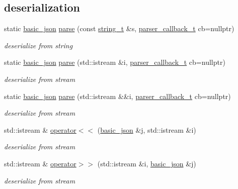 \subsection*{deserialization}
\begin{DoxyCompactItemize}
\item 
static \hyperlink{a00025}{basic\+\_\+json} \hyperlink{a00025_a35303ad045a06c2a79dc28ac29652e86}{parse} (const \hyperlink{a00025_ab63e618bbb0371042b1bec17f5891f42}{string\+\_\+t} \&s, \hyperlink{a00025_a9e35475e2027520a78e09f460dbe048a}{parser\+\_\+callback\+\_\+t} cb=nullptr)
\begin{DoxyCompactList}\small\item\em deserialize from string \end{DoxyCompactList}\item 
static \hyperlink{a00025}{basic\+\_\+json} \hyperlink{a00025_a13c4d2ab4e7ee2f92be785a7b12948ff}{parse} (std\+::istream \&i, \hyperlink{a00025_a9e35475e2027520a78e09f460dbe048a}{parser\+\_\+callback\+\_\+t} cb=nullptr)
\begin{DoxyCompactList}\small\item\em deserialize from stream \end{DoxyCompactList}\item 
static \hyperlink{a00025}{basic\+\_\+json} \hyperlink{a00025_ab81f2801779e6cb9d98770860af2e39a}{parse} (std\+::istream \&\&i, \hyperlink{a00025_a9e35475e2027520a78e09f460dbe048a}{parser\+\_\+callback\+\_\+t} cb=nullptr)
\begin{DoxyCompactList}\small\item\em deserialize from stream \end{DoxyCompactList}\item 
std\+::istream \& \hyperlink{a00025_a60ca396028b8d9714c6e10efbf475af6}{operator$<$$<$} (\hyperlink{a00025}{basic\+\_\+json} \&j, std\+::istream \&i)
\begin{DoxyCompactList}\small\item\em deserialize from stream \end{DoxyCompactList}\item 
std\+::istream \& \hyperlink{a00025_aaf363408931d76472ded14017e59c9e8}{operator$>$$>$} (std\+::istream \&i, \hyperlink{a00025}{basic\+\_\+json} \&j)
\begin{DoxyCompactList}\small\item\em deserialize from stream \end{DoxyCompactList}\end{DoxyCompactItemize}



